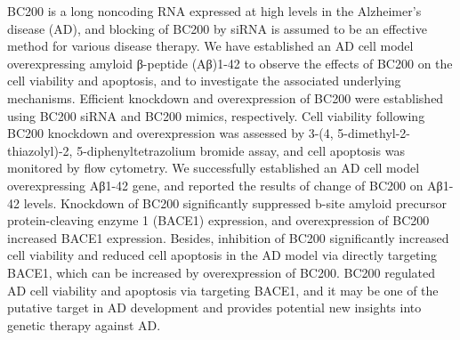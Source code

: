 \documentclass[11pt]{article}
\begin{document}
BC200 is a long noncoding RNA expressed at high levels in the Alzheimer’s disease (AD), and blocking of BC200 by siRNA is assumed to be an effective method for various disease therapy. 
We have established an AD cell model overexpressing amyloid β-peptide (Aβ)1-42 to observe the effects of BC200 on the cell viability and apoptosis, and to investigate the associated underlying mechanisms. 
Efficient knockdown and overexpression of BC200 were established using BC200 siRNA and BC200 mimics, respectively. 
Cell viability following BC200 knockdown and overexpression was assessed by 3-(4, 5-dimethyl-2-thiazolyl)-2, 5-diphenyltetrazolium bromide assay, and cell apoptosis was monitored by flow cytometry. 
We successfully established an AD cell model overexpressing Aβ1-42 gene, and reported the results of change of BC200 on Aβ1-42 levels. 
Knockdown of BC200 significantly suppressed b-site amyloid precursor protein-cleaving enzyme 1 (BACE1) expression, and overexpression of BC200 increased BACE1 expression. 
Besides, inhibition of BC200 significantly increased cell viability and reduced cell apoptosis in the AD model via directly targeting BACE1, which can be increased by overexpression of BC200. 
BC200 regulated AD cell viability and apoptosis via targeting BACE1, and it may be one of the putative target in AD development and provides potential new insights into genetic therapy against AD.



\end{document}
